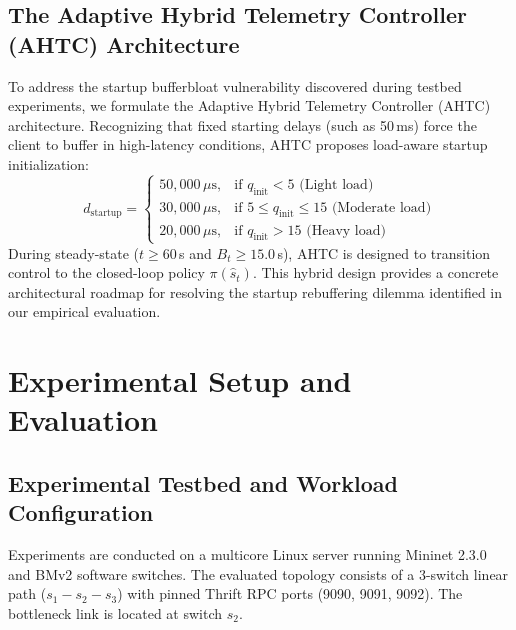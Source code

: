 \documentclass[12pt,a4paper,oneside]{report}
\begin{document}
\section{The Adaptive Hybrid Telemetry Controller (AHTC) Architecture}
To address the startup bufferbloat vulnerability discovered during testbed experiments, we formulate the Adaptive Hybrid Telemetry Controller (AHTC) architecture. Recognizing that fixed starting delays (such as 50\,ms) force the client to buffer in high-latency conditions, AHTC proposes load-aware startup initialization:
\begin{equation}
  d_{\text{startup}} = 
  \begin{cases}
    50,000\,\mu\text{s}, & \text{if } q_{\text{init}} < 5 \text{ (Light load)} \\
    30,000\,\mu\text{s}, & \text{if } 5 \le q_{\text{init}} \le 15 \text{ (Moderate load)} \\
    20,000\,\mu\text{s}, & \text{if } q_{\text{init}} > 15 \text{ (Heavy load)}
  \end{cases}
  \label{eq:adaptive_startup}
\end{equation}
During steady-state ($t \ge 60$\,s and $B_t \ge 15.0$\,s), AHTC is designed to transition control to the closed-loop policy $\pi(\hat{s}_t)$. This hybrid design provides a concrete architectural roadmap for resolving the startup rebuffering dilemma identified in our empirical evaluation.


\chapter{Experimental Setup and Evaluation}
\label{ch:eval_setup}

\section{Experimental Testbed and Workload Configuration}
Experiments are conducted on a multicore Linux server running Mininet 2.3.0 and BMv2 software switches. The evaluated topology consists of a 3-switch linear path ($s_1 - s_2 - s_3$) with pinned Thrift RPC ports (9090, 9091, 9092). The bottleneck link is located at switch $s_2$.
\end{document}
